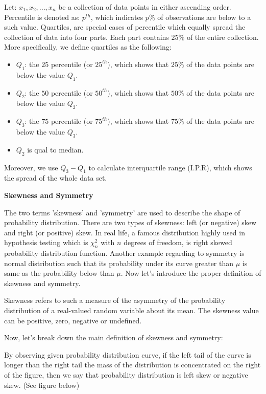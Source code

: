 \begin{definition}
Let: $x_1, x_2, ..., x_n$ be a collection of data points in either ascending order. Percentile is denoted as: $p^{th}$, which indicates $p \%$ of observations are below to a such value. Quartiles, are special cases of percentile which equally spread the collection of data into four parts. Each part contains $25\%$ of the entire collection. More specifically, we define quartiles as the following:
\begin{itemize}
 \item $Q_1$: the $25$ percentile (or $25^{th}$), which shows that $25\%$ of the data points are below the value $Q_1$.
 \item $Q_2$: the $50$ percentile (or $50^{th}$), which shows that $50\%$ of the data points are below the value $Q_2$.
 \item $Q_3$: the $75$ percentile (or $75^{th}$), which shows that $75\%$ of the data points are below the value $Q_3$.
 \item $Q_2$ is qual to median.
\end{itemize}
Moreover, we use $Q_3 - Q_1$ to calculate interquartile range (I.P.R), which shows the spread of the whole data set.
\end{definition}

\textbf{Skewness and Symmetry}

The two terms 'skewness' and 'symmetry' are used to describe the shape of probability distribution. There are two types of skewness: left (or negative) skew and right (or positive) skew. In real life, a famous distribution highly used in hypothesis testing which is $\chi_{n}^{2}$ with $n$ degrees of freedom, is right skewed probability distribution function. Another example regarding to symmetry is normal distribution such that its probability under its curve greater than $\mu$ is same as the probability below than $\mu$. Now let's introduce the proper definition of skewness and symmetry.

\begin{definition}[Skewness]
Skewness refers to such a measure of the asymmetry of the probability distribution of a real-valued random variable about its mean. The skewness value can be positive, zero, negative or undefined.
\end{definition}

Now, let's break down the main definition of skewness and symmetry:

\begin{definition}
By observing given probability distribution curve, if the left tail of the curve is longer than the right tail the mass of the distribution is concentrated on the right of the figure, then we say that probability distribution is left skew or negative skew. (See figure below)
\end{definition}


